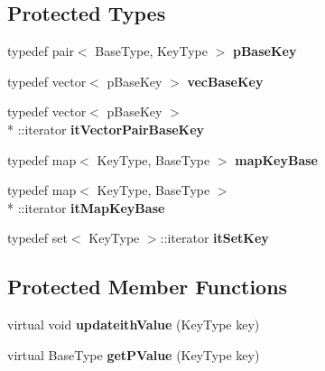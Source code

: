 \subsection*{Protected Types}
\begin{DoxyCompactItemize}
\item 
\hypertarget{classMultiBoost_1_1Exp3LS_a56cf772f45842cf82f412617a89c4157}{typedef pair$<$ Base\-Type, Key\-Type $>$ {\bfseries p\-Base\-Key}}\label{classMultiBoost_1_1Exp3LS_a56cf772f45842cf82f412617a89c4157}

\item 
\hypertarget{classMultiBoost_1_1Exp3LS_ab47ecaca2c75ed93535da0208eed0a00}{typedef vector$<$ p\-Base\-Key $>$ {\bfseries vec\-Base\-Key}}\label{classMultiBoost_1_1Exp3LS_ab47ecaca2c75ed93535da0208eed0a00}

\item 
\hypertarget{classMultiBoost_1_1Exp3LS_a02d60b4864ffdb98f81cab146a34afcf}{typedef vector$<$ p\-Base\-Key $>$\\*
\-::iterator {\bfseries it\-Vector\-Pair\-Base\-Key}}\label{classMultiBoost_1_1Exp3LS_a02d60b4864ffdb98f81cab146a34afcf}

\item 
\hypertarget{classMultiBoost_1_1Exp3LS_a61c4f9184a570de2d1dbfd13ec8457d8}{typedef map$<$ Key\-Type, Base\-Type $>$ {\bfseries map\-Key\-Base}}\label{classMultiBoost_1_1Exp3LS_a61c4f9184a570de2d1dbfd13ec8457d8}

\item 
\hypertarget{classMultiBoost_1_1Exp3LS_a5d1ee59548ecd78a99ae4fe6d4782207}{typedef map$<$ Key\-Type, Base\-Type $>$\\*
\-::iterator {\bfseries it\-Map\-Key\-Base}}\label{classMultiBoost_1_1Exp3LS_a5d1ee59548ecd78a99ae4fe6d4782207}

\item 
\hypertarget{classMultiBoost_1_1Exp3LS_aa7379cc046bfee84de02b46f844d7d76}{typedef set$<$ Key\-Type $>$\-::iterator {\bfseries it\-Set\-Key}}\label{classMultiBoost_1_1Exp3LS_aa7379cc046bfee84de02b46f844d7d76}

\end{DoxyCompactItemize}
\subsection*{Protected Member Functions}
\begin{DoxyCompactItemize}
\item 
\hypertarget{classMultiBoost_1_1Exp3LS_a2ba8dda6c4af4ce06b8997c693fd4209}{virtual void {\bfseries updateith\-Value} (Key\-Type key)}\label{classMultiBoost_1_1Exp3LS_a2ba8dda6c4af4ce06b8997c693fd4209}

\item 
\hypertarget{classMultiBoost_1_1Exp3LS_a9510a6f2cb484c543afa3db475737543}{virtual Base\-Type {\bfseries get\-P\-Value} (Key\-Type key)}\label{classMultiBoost_1_1Exp3LS_a9510a6f2cb484c543afa3db475737543}

\end{DoxyCompactItemize}
